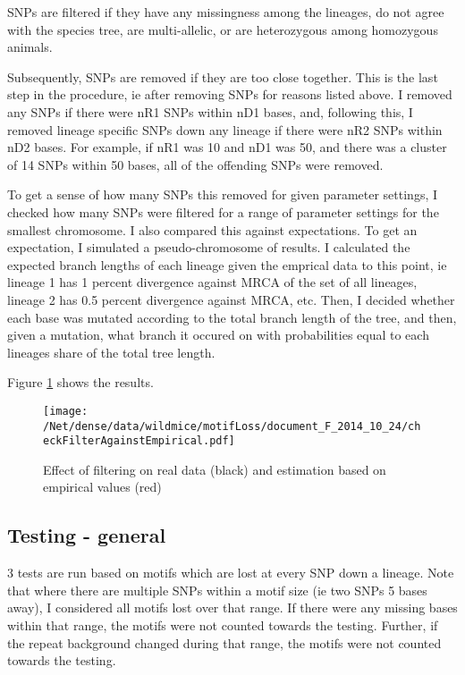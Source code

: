 \documentclass{article}\usepackage[]{graphicx}\usepackage[]{color}
\begin{document}
SNPs are filtered if they have any missingness among the lineages, do not agree with the species tree, are multi-allelic, or are heterozygous among homozygous animals. 

Subsequently, SNPs are removed if they are too close together. This is the last step in the procedure, ie after removing SNPs for reasons listed above. I removed any SNPs if there were nR1 SNPs within nD1 bases, and, following this, I removed lineage specific SNPs down any lineage if there were nR2 SNPs within nD2 bases. For example, if nR1 was 10 and nD1 was 50, and there was a cluster of 14 SNPs within 50 bases, all of the offending SNPs were removed. 

To get a sense of how many SNPs this removed for given parameter settings, I checked how many SNPs were filtered for a range of parameter settings for the smallest chromosome. I also compared this against expectations. To get an expectation, I simulated a pseudo-chromosome of results. I calculated the expected branch lengths of each lineage given the emprical data to this point, ie lineage 1 has 1 percent divergence against MRCA of the set of all lineages, lineage 2 has 0.5 percent divergence against MRCA, etc. Then, I decided whether each base was mutated according to the total branch length of the tree, and then, given a mutation, what branch it occured on with probabilities equal to each lineages share of the total tree length. 

Figure \ref{fig:effectOfFiltering} shows the results. 

\begin{figure}[h!]
\caption{Effect of filtering on real data (black) and estimation based on empirical values (red)}
\centering
\texttt{[image: /Net/dense/data/wildmice/motifLoss/document\_F\_2014\_10\_24/checkFilterAgainstEmpirical.pdf]}\label{fig:effectOfFiltering}
\end{figure}



\subsection*{Testing - general}

3 tests are run based on motifs which are lost at every SNP down a lineage. Note that where there are multiple SNPs within a motif size (ie two SNPs 5 bases away), I considered all motifs lost over that range. If there were any missing bases within that range, the motifs were not counted towards the testing. Further, if the repeat background changed during that range, the motifs were not counted towards the testing.
\end{document}
